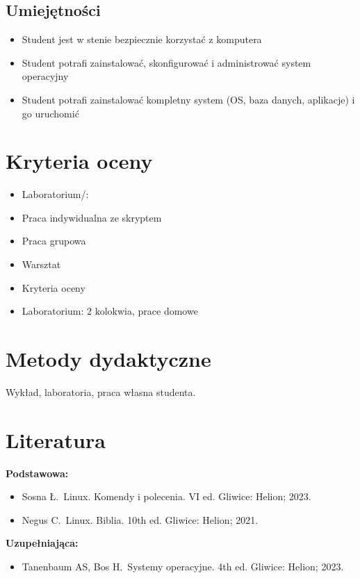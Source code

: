 \documentclass[12pt, a4paper]{article}
\begin{document}
\subsection*{Umiejętności}
\begin{itemize}
  \item Student jest w stenie bezpiecznie korzystać z komputera
  \item Student potrafi zainstalować, skonfigurować i administrować system operacyjny
  \item Student potrafi zainstalować kompletny system (OS, baza danych, aplikacje) i go uruchomić
\end{itemize}

\section{Kryteria oceny}

\begin{itemize}
  \item Laboratorium/:
  \item Praca indywidualna ze skryptem
  \item Praca grupowa
  \item Warsztat
  \item Kryteria oceny
  \item Laboratorium: 2 kolokwia, prace domowe
\end{itemize}

\section{Metody dydaktyczne}

Wykład, laboratoria, praca własna studenta.

\section{Literatura}

\textbf{Podstawowa:}
\begin{itemize}
  \item Sosna Ł. Linux. Komendy i polecenia. VI ed. Gliwice: Helion; 2023.
  \item Negus C. Linux. Biblia. 10th ed. Gliwice: Helion; 2021.
\end{itemize}

\textbf{Uzupełniająca:}
\begin{itemize}
  \item Tanenbaum AS, Bos H. Systemy operacyjne. 4th ed. Gliwice: Helion; 2023.
\end{itemize}
\end{document}
